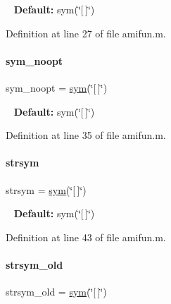 ~\newline
{\bfseries Default\+:} sym(\char`\"{}\mbox{[}$\,$\mbox{]}\char`\"{}) 

Definition at line 27 of file amifun.\+m.

\mbox{\label{classamifun_a653c7ed7ae2eeb18b7cb2f0a6be8ab5b}} 
\paragraph{\texorpdfstring{sym\+\_\+noopt}{sym\_noopt}}
{\footnotesize\ttfamily sym\+\_\+noopt = \mbox{\hyperlink{classamifun_a3c48fff3d28406486a4f1b5e18da7ca6}{sym}}(\char`\"{}\mbox{[}$\,$\mbox{]}\char`\"{})}

~\newline
{\bfseries Default\+:} sym(\char`\"{}\mbox{[}$\,$\mbox{]}\char`\"{}) 

Definition at line 35 of file amifun.\+m.

\mbox{\label{classamifun_a4814315a739f43461b003c1c1ef6f550}} 
\paragraph{\texorpdfstring{strsym}{strsym}}
{\footnotesize\ttfamily strsym = \mbox{\hyperlink{classamifun_a3c48fff3d28406486a4f1b5e18da7ca6}{sym}}(\char`\"{}\mbox{[}$\,$\mbox{]}\char`\"{})}

~\newline
{\bfseries Default\+:} sym(\char`\"{}\mbox{[}$\,$\mbox{]}\char`\"{}) 

Definition at line 43 of file amifun.\+m.

\mbox{\label{classamifun_ac42759baa6575c9d39f487be5a2e01a1}} 
\paragraph{\texorpdfstring{strsym\+\_\+old}{strsym\_old}}
{\footnotesize\ttfamily strsym\+\_\+old = \mbox{\hyperlink{classamifun_a3c48fff3d28406486a4f1b5e18da7ca6}{sym}}(\char`\"{}\mbox{[}$\,$\mbox{]}\char`\"{})}

